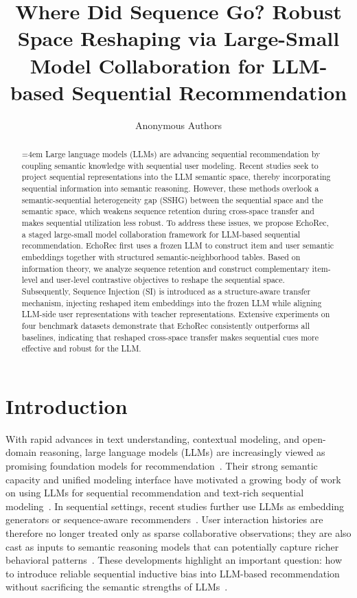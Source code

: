 ﻿\documentclass{article}
\title{Where Did Sequence Go? Robust Space Reshaping via Large-Small Model Collaboration for LLM-based Sequential Recommendation}
\author{Anonymous Authors}
\begin{document}
\maketitle

\begin{abstract}
\begingroup
{}
\emergencystretch=4em
\sloppy
Large language models (LLMs) are advancing sequential recommendation by coupling semantic knowledge with sequential user modeling. Recent studies seek to project sequential representations into the LLM semantic space, thereby incorporating sequential information into semantic reasoning. However, these methods overlook a semantic-sequential heterogeneity gap (SSHG) between the sequential space and the semantic space, which weakens sequence retention during cross-space transfer and makes sequential utilization less robust. To address these issues, we propose EchoRec, a staged large-small model collaboration framework for LLM-based sequential recommendation. EchoRec first uses a frozen LLM to construct item and user semantic embeddings together with structured semantic-neighborhood tables.  Based on information theory, we analyze sequence retention and construct complementary item-level and user-level contrastive objectives to reshape the sequential space. Subsequently, Sequence Injection (SI) is introduced as a structure-aware transfer mechanism, injecting reshaped item embeddings into the frozen LLM while aligning LLM-side user representations with teacher representations. Extensive experiments on four benchmark datasets demonstrate that EchoRec consistently outperforms all baselines, indicating that reshaped cross-space transfer makes sequential cues more effective and robust for the LLM.
\endgroup
\end{abstract}

\section{Introduction}
\label{sec:introduction}

With rapid advances in text understanding, contextual modeling, and open-domain reasoning, large language models (LLMs) are increasingly viewed as promising foundation models for recommendation~\cite{lin2025survey,zhao2024era}. Their strong semantic capacity and unified modeling interface have motivated a growing body of work on using LLMs for sequential recommendation and text-rich sequential modeling~\cite{liu2025recbench,zheng2024trsr}. In sequential settings, recent studies further use LLMs as embedding generators or sequence-aware recommenders~\cite{he2025llm2rec,kim2025lost}. User interaction histories are therefore no longer treated only as sparse collaborative observations; they are also cast as inputs to semantic reasoning models that can potentially capture richer behavioral patterns~\cite{hong2025eagerllm}. These developments highlight an important question: how to introduce reliable sequential inductive bias into LLM-based recommendation without sacrificing the semantic strengths of LLMs~\cite{kim2025lost,hong2025eagerllm}.
\end{document}
